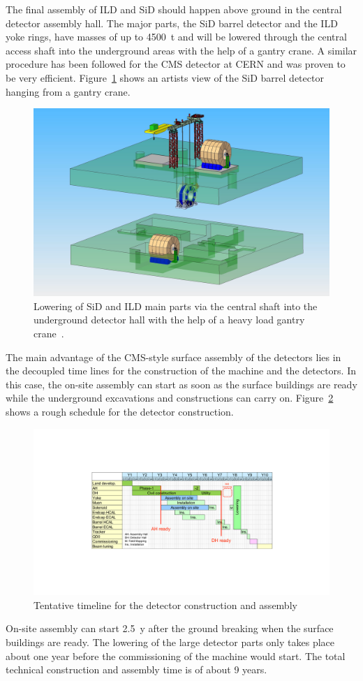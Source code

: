The final assembly of ILD and SiD should happen above ground in the central detector assembly hall. The major parts, the SiD barrel detector and the ILD yoke rings, have masses of up to 4500~t and will be lowered through the central access shaft into the underground areas with the help of a gantry crane. A similar procedure has been followed for the CMS detector at CERN and was proven to be very efficient. Figure~\ref{fig:integration:gantry_crane} shows an artists view of the SiD barrel detector hanging from a gantry crane.
\begin{figure}[h!]
\centering
\includegraphics[width=0.8\hsize]{Integration/fig/gantry_crane.png}
\caption{\label{fig:integration:gantry_crane}Lowering of SiD and ILD main parts via the central shaft into the underground detector hall with the help of a heavy load gantry crane~\cite{ild:bib:gantry_crane}.}
\end{figure}

The main advantage of the CMS-style surface assembly of the detectors lies in the decoupled time lines for the construction of the machine and the detectors. In this case, the on-site assembly can start as soon as the surface buildings are ready while the underground excavations and constructions can carry on. Figure~\ref{fig:integration:assembly_timeline} shows a rough schedule for the detector construction.
\begin{figure}[h!]
\centering
\includegraphics[width=0.8\hsize]{Integration/fig/Detector_Assembly_Timeline.pdf}
\caption{\label{fig:integration:assembly_timeline}Tentative timeline for the detector construction and assembly~\cite{ild:bib:ejade_mdi, ild:bib:assembly}}
\end{figure}
On-site assembly can start 2.5~y after the ground breaking when the surface buildings are ready. The lowering of the large detector parts only takes place about one year before the commissioning of the machine would start. The total technical construction and assembly time is of about 9 years.